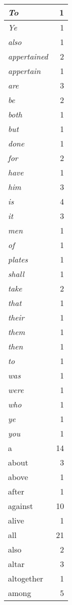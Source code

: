 \begin{center}
\begin{longtable}{l|r}
\emph{To} & 1 \\ \hline
\emph{Ye} & 1 \\ \hline
\emph{also} & 1 \\ \hline
\emph{appertained} & 2 \\ \hline
\emph{appertain} & 1 \\ \hline
\emph{are} & 3 \\ \hline
\emph{be} & 2 \\ \hline
\emph{both} & 1 \\ \hline
\emph{but} & 1 \\ \hline
\emph{done} & 1 \\ \hline
\emph{for} & 2 \\ \hline
\emph{have} & 1 \\ \hline
\emph{him} & 3 \\ \hline
\emph{is} & 4 \\ \hline
\emph{it} & 3 \\ \hline
\emph{men} & 1 \\ \hline
\emph{of} & 1 \\ \hline
\emph{plates} & 1 \\ \hline
\emph{shall} & 1 \\ \hline
\emph{take} & 2 \\ \hline
\emph{that} & 1 \\ \hline
\emph{their} & 1 \\ \hline
\emph{them} & 1 \\ \hline
\emph{then} & 1 \\ \hline
\emph{to} & 1 \\ \hline
\emph{was} & 1 \\ \hline
\emph{were} & 1 \\ \hline
\emph{who} & 1 \\ \hline
\emph{ye} & 1 \\ \hline
\emph{you} & 1 \\ \hline
a & 14 \\ \hline
about & 3 \\ \hline
above & 1 \\ \hline
after & 1 \\ \hline
against & 10 \\ \hline
alive & 1 \\ \hline
all & 21 \\ \hline
also & 2 \\ \hline
altar & 3 \\ \hline
altogether & 1 \\ \hline
among & 5 \\ \hline

\end{longtable}
\end{center}
